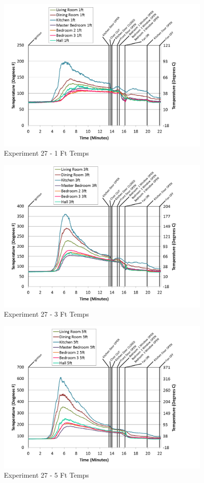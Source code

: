 \documentclass{article}
\begin{document}
\begin{appendices}
\begin{figure}[h!]
	\centering
	\includegraphics[height=3.05in]{0_Images/Results_Charts/Exp_27_Charts/1FtTemps.png}
	\caption{Experiment 27 - 1 Ft Temps}
\end{figure}


\begin{figure}[h!]
	\centering
	\includegraphics[height=3.05in]{0_Images/Results_Charts/Exp_27_Charts/3FtTemps.png}
	\caption{Experiment 27 - 3 Ft Temps}
\end{figure}

\clearpage

\begin{figure}[h!]
	\centering
	\includegraphics[height=3.05in]{0_Images/Results_Charts/Exp_27_Charts/5FtTemps.png}
	\caption{Experiment 27 - 5 Ft Temps}
\end{figure}



\end{appendices}
\end{document}
